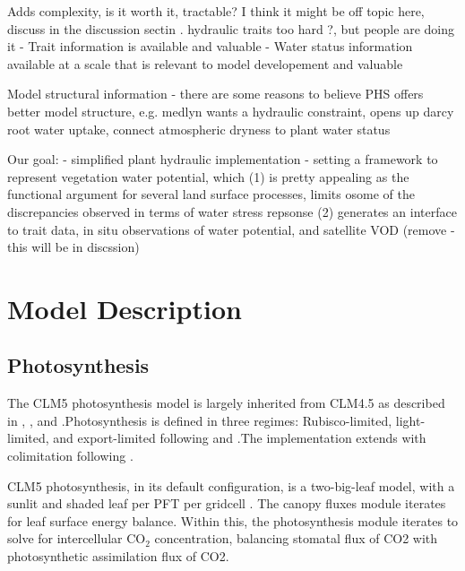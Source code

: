 \documentclass[draft,linenumbers]{agujournal}
\begin{document}
Adds complexity, is it worth it, tractable? I think it might be off topic here, discuss in the discussion sectin
       . hydraulic traits too hard \citep{drake2017}?, but people are doing it \citep{xu2016,christoffersen2016}
  - Trait information is available \citep{kattge2011,anderegg2015a} and valuable \citep{choat2012}
  - Water status information available at a scale that is relevant to model developement \citep{konings2016,grant2016} and valuable \citep{momen2017,konings2017b}

Model structural information
  - there are some reasons to believe PHS offers better model structure,
  e.g. medlyn wants a hydraulic constraint, opens up darcy root water uptake, connect atmospheric dryness to plant water status
  
Our goal:
  - simplified plant hydraulic implementation
  - setting a framework to represent vegetation water potential, which
  (1) is pretty appealing as the functional argument for several land surface processes, limits osome of the discrepancies observed in terms of water stress repsonse
  (2) generates an interface to trait data, in situ observations of water potential, and satellite VOD \citep{momen2017} (remove - this will be in discssion)


\section{Model Description}

\subsection{Photosynthesis}
\label{sect:A}
    The CLM5 photosynthesis model is largely inherited from CLM4.5 as described in \citet{bonan2011}, \citet{thornton2007},
    and \citet{oleson2013}.Photosynthesis is defined in three regimes: Rubisco-limited, light-limited, and export-limited 
    following \citet{farquhar1980} and \citet{harley1992}.The implementation extends \citet{sellers1996a,sellers1996b} with 
    colimitation following \citet{collatz1991}. 
    
    CLM5 photosynthesis, in its default configuration, is a two-big-leaf model, with a sunlit and shaded leaf per PFT per gridcell \citep{thornton2007, dai2004, oleson2013}. 
    The canopy fluxes module iterates for leaf surface energy balance.
    Within this, the photosynthesis module iterates to solve for intercellular CO$_2$ concentration, balancing stomatal flux of 
    CO2 with photosynthetic assimilation flux of CO2.
    
\end{document}
